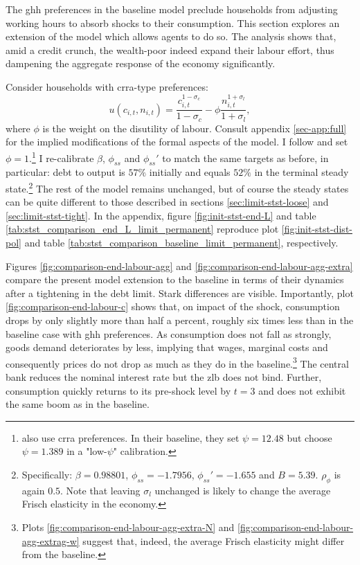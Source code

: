 \documentclass[a4paper,12pt]{article} %
\numberwithin{equation}{section} %
\numberwithin{figure}{section}
\numberwithin{table}{section}
\begin{document}
The \Gls{ghh} preferences in the baseline model preclude households from adjusting working hours to absorb shocks to their consumption. This section explores an extension of the model which allows agents to do so. The analysis shows that, amid a credit crunch, the wealth-poor indeed expand their labour effort, thus dampening the aggregate response of the economy significantly.

Consider households with \Gls{crra}-type preferences:
\begin{equation}
    u(c_{i,t}, n_{i,t}) = \frac{c_{i,t}^{1-\sigma_c}}{1-\sigma_c} - \phi \frac{n_{i,t}^{1+\sigma_l}}{1+\sigma_l}, \label{eq:hh-crra-utility}
\end{equation}
where $\phi$ is the weight on the disutility of labour. Consult appendix \ref{sec-app:full} for the implied modifications of the formal aspects of the model. I follow \textcite{mckay2016} and set $\phi=1$.\footnote{\textcite{gl2017} also use \Gls{crra} preferences. In their baseline, they set $\psi = 12.48$ but choose $\psi = 1.389$ in a "low-$\psi$" calibration.} I re-calibrate $\beta$, $\phi_{ss}$ and $\phi_{ss}'$ to match the same targets as before, in particular: debt to output is $57\%$ initially and equals $52\%$ in the terminal steady state.\footnote{Specifically: $\beta = 0.98801$, $\phi_{ss} = -1.7956$, $\phi_{ss}' = -1.655$ and $B = 5.39$. $\rho_{\phi}$ is again $0.5$. Note that leaving $\sigma_l$ unchanged is likely to change the average Frisch elasticity in the economy.} The rest of the model remains unchanged, but of course the steady states can be quite different to those described in sections \ref{sec:limit-stst-loose} and \ref{sec:limit-stst-tight}. In the appendix, figure \ref{fig:init-stst-end-L} and table \ref{tab:stst_comparison_end_L_limit_permanent} reproduce plot \ref{fig:init-stst-dist-pol} and table \ref{tab:stst_comparison_baseline_limit_permanent}, respectively.

Figures \ref{fig:comparison-end-labour-agg} and \ref{fig:comparison-end-labour-agg-extra} compare the present model extension to the baseline in terms of their dynamics after a tightening in the debt limit. Stark differences are visible. Importantly, plot \ref{fig:comparison-end-labour-c} shows that, on impact of the shock, consumption drops by only slightly more than half a percent, roughly six times less than in the baseline case with \Gls{ghh} preferences. As consumption does not fall as strongly, goods demand deteriorates by less, implying that wages, marginal costs and consequently prices do not drop as much as they do in the baseline.\footnote{Plots \ref{fig:comparison-end-labour-agg-extra-N} and \ref{fig:comparison-end-labour-agg-extrag-w} suggest that, indeed, the average Frisch elasticity might differ from the baseline.} The central bank reduces the nominal interest rate but the \Gls{zlb} does not bind. Further, consumption quickly returns to its pre-shock level by $t=3$ and does not exhibit the same boom as in the baseline. 
\end{document}
